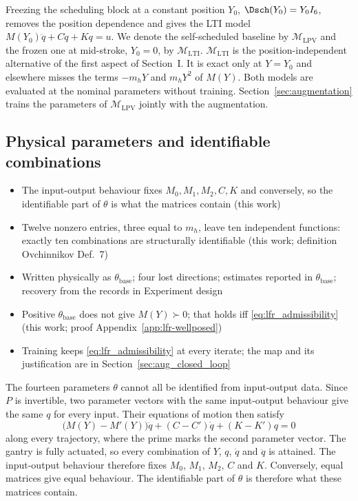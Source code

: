 Freezing the scheduling block at a constant position $Y_0$,
$\Dsch(Y_0)=Y_0I_6$, removes the position dependence and gives the LTI model
$M(Y_0)\ddot q+C\dot q+Kq=u$.
We denote the self-scheduled baseline by $\mathcal M_{\mathrm{LPV}}$ and the
frozen one at mid-stroke, $Y_0=0$, by $\mathcal M_{\mathrm{LTI}}$.
$\mathcal M_{\mathrm{LTI}}$ is the position-independent alternative of the
first aspect of Section~I.
It is exact only at $Y=Y_0$ and elsewhere misses the terms $-m_hY$ and
$m_hY^2$ of $M(Y)$.
Both models are evaluated at the nominal parameters without training.
Section~\ref{sec:augmentation} trains the parameters of $\mathcal M_{\mathrm{LPV}}$
jointly with the augmentation.

\subsection{Physical parameters and identifiable combinations}\label{sec:params}
\ifdraft
\begin{itemize}
\item The input-output behaviour fixes $M_0,M_1,M_2,C,K$ and conversely, so the identifiable part of $\theta$ is what the matrices contain (this work)
\item Twelve nonzero entries, three equal to $m_h$, leave ten independent functions: exactly ten combinations are structurally identifiable (this work; definition Ovchinnikov Def.~7)
\item Written physically as $\theta_{\mathrm{base}}$; four lost directions; estimates reported in $\theta_{\mathrm{base}}$; recovery from the records in Experiment design
\item Positive $\theta_{\mathrm{base}}$ does not give $M(Y)\succ0$; that holds iff \eqref{eq:lfr_admissibility} (this work; proof Appendix~\ref{app:lfr-wellposed})
\item Training keeps \eqref{eq:lfr_admissibility} at every iterate; the map and its justification are in Section~\ref{sec:aug_closed_loop}
\end{itemize}
\fi
The fourteen parameters $\theta$ cannot all be identified from input-output
data.
Since $P$ is invertible, two parameter vectors with the same input-output
behaviour give the same $q$ for every input.
Their equations of motion then satisfy
\begin{equation*}
  \bigl(M(Y)-M'(Y)\bigr)\ddot q+(C-C')\dot q+(K-K')q=0
\end{equation*}
along every trajectory, where the prime marks the second parameter vector.
The gantry is fully actuated, so every combination of $Y$, $q$, $\dot q$ and
$\ddot q$ is attained.
The input-output behaviour therefore fixes $M_0$, $M_1$, $M_2$, $C$ and $K$.
Conversely, equal matrices give equal behaviour.
The identifiable part of $\theta$ is therefore what these matrices contain.

